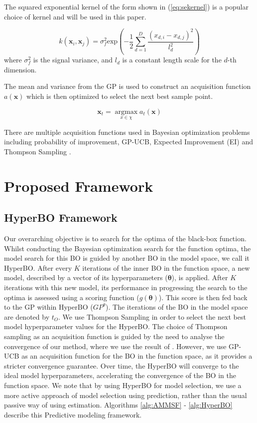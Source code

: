 \documentclass{article}
\begin{document}
The squared exponential kernel of the form shown in (\ref{eq:sekernel}) is a popular choice of kernel and will be used in this paper.

\begin{equation} \label{eq:sekernel}
k(\textbf{x}_i,\textbf{x}_j) = \sigma_{f}^2 \text{exp}(-\frac{1}{2} \sum_{d=1}^{D} \frac{(x_{d,i} - x_{d,j})^2}{l_{d}^2})
\end{equation}
where $\sigma_{f}^2$ is the signal variance, and $l_{d}$ is a constant length scale for the $d$-th dimension.

The mean and variance from the GP is used to construct an acquisition function $a(\boldsymbol{x})$ which is then optimized to select the next best sample point. 

\begin{equation}\label{eq:BO_acquisition}
\textbf{x}_{t} = \operatorname*{argmax}_{x\in \chi}  a_{t}(\textbf{x})
\end{equation}

There are multiple acquisition functions used in Bayesian optimization problems including probability of improvement, GP-UCB, Expected Improvement (EI) and Thompson Sampling \cite{DBLP:journals/corr/abs-1012-2599,Basu2017}.

\section{Proposed Framework}

\subsection{HyperBO Framework}
Our overarching objective is to search for the optima of the black-box function. Whilst conducting the Bayesian optimization search for the function optima, the model search for this BO is  guided by another BO in the model space, we call it HyperBO. After every $K$ iterations of the inner BO in the function space, a new model, described by a vector of its hyperparameters ($\boldsymbol{\theta}$), is applied. After $K$ iterations with this new model, its performance in progressing the search to the optima is assessed using a scoring function ($g(\boldsymbol{\theta})$). This score is then fed back to the GP within HyperBO ($GP^{\theta}$). The iterations of the BO in the model space are denoted by $t_O$. We use Thompson Sampling in order to select the next best model hyperparameter values for the HyperBO. The choice of Thompson sampling as an acquisition function is guided by the need to analyse the convergence of our method, where we use the result of \cite{Basu2017}. However, we use GP-UCB as an acquisition function for the BO in the function space, as it provides a stricter convergence guarantee. Over time, the HyperBO will converge to the ideal model hyperparameters, accelerating the convergence of the BO in the function space. We note that by using HyperBO for model selection, we use a more active approach of model selection using prediction, rather than the usual passive way of using estimation. Algorithms \ref{alg:AMMSF} - \ref{alg:HyperBO} describe this Predictive modeling framework.
\end{document}
